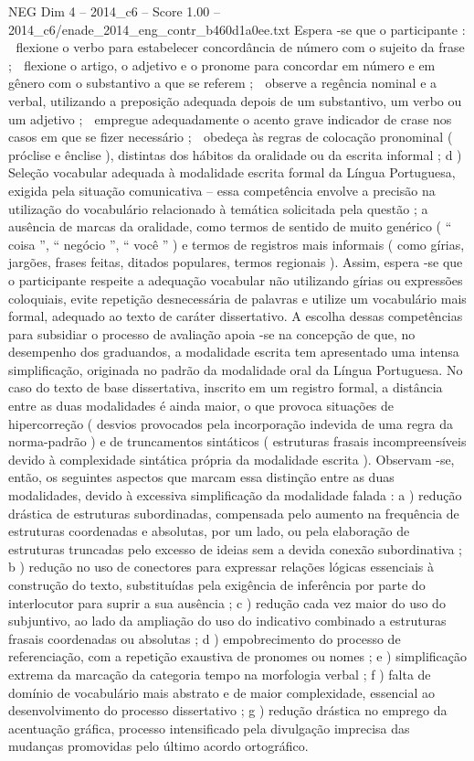\begin{textsample}{NEG Dim 4 – 2014\_c6 – Score 1.00 – 2014\_c6/enade\_2014\_eng\_contr\_b460d1a0ee.txt}
Espera -se que o participante :  flexione o verbo para estabelecer concordância de número com o sujeito da frase ;  flexione o artigo, o adjetivo e o pronome para concordar em número e em gênero com o substantivo a que se referem ;  observe a regência nominal e a verbal, utilizando a preposição adequada depois de um substantivo, um verbo ou um adjetivo ;  empregue adequadamente o acento grave indicador de crase nos casos em que se fizer necessário ;  obedeça às regras de colocação pronominal ( próclise e ênclise ), distintas dos hábitos da oralidade ou da escrita informal ; d ) Seleção vocabular adequada à modalidade escrita formal da Língua Portuguesa, exigida pela situação comunicativa – essa competência envolve a precisão na utilização do vocabulário relacionado à temática solicitada pela questão ; a ausência de marcas da oralidade, como termos de sentido de muito genérico ( “ coisa ”, “ negócio ”, “ você ” ) e termos de registros mais informais ( como gírias, jargões, frases feitas, ditados populares, termos regionais ).
Assim, espera -se que o participante respeite a adequação vocabular não utilizando gírias ou expressões coloquiais, evite repetição desnecessária de palavras e utilize um vocabulário mais formal, adequado ao texto de caráter dissertativo.
A escolha dessas competências para subsidiar o processo de avaliação apoia -se na concepção de que, no desempenho dos graduandos, a modalidade escrita tem apresentado uma intensa simplificação, originada no padrão da modalidade oral da Língua Portuguesa.
No caso do texto de base dissertativa, inscrito em um registro formal, a distância entre as duas modalidades é ainda maior, o que provoca situações de hipercorreção ( desvios provocados pela incorporação indevida de uma regra da norma-padrão ) e de truncamentos sintáticos ( estruturas frasais incompreensíveis devido à complexidade sintática própria da modalidade escrita ).
Observam -se, então, os seguintes aspectos que marcam essa distinção entre as duas modalidades, devido à excessiva simplificação da modalidade falada : a ) redução drástica de estruturas subordinadas, compensada pelo aumento na frequência de estruturas coordenadas e absolutas, por um lado, ou pela elaboração de estruturas truncadas pelo excesso de ideias sem a devida conexão subordinativa ; b ) redução no uso de conectores para expressar relações lógicas essenciais à construção do texto, substituídas pela exigência de inferência por parte do interlocutor para suprir a sua ausência ; c ) redução cada vez maior do uso do subjuntivo, ao lado da ampliação do uso do indicativo combinado a estruturas frasais coordenadas ou absolutas ; d ) empobrecimento do processo de referenciação, com a repetição exaustiva de pronomes ou nomes ; e ) simplificação extrema da marcação da categoria tempo na morfologia verbal ; f ) falta de domínio de vocabulário mais abstrato e de maior complexidade, essencial ao desenvolvimento do processo dissertativo ; g ) redução drástica no emprego da acentuação gráfica, processo intensificado pela divulgação imprecisa das mudanças promovidas pelo último acordo ortográfico.

\end{textsample}
